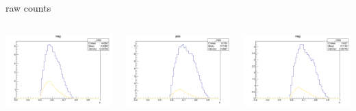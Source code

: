 \begin{frame}{raw counts}
\begin{columns}
\begin{column}[T]{0.25\textwidth}
\includegraphics[width = \textwidth]{results/yield/statistics/yield_x_Q2_z_0.50_5.000_0.60_neg.png}
\end{column}
\begin{column}[T]{0.25\textwidth}
\includegraphics[width = \textwidth]{results/yield/statistics/yield_x_Q2_z_0.50_5.000_0.70_pos.png}
\end{column}
\begin{column}[T]{0.25\textwidth}
\includegraphics[width = \textwidth]{results/yield/statistics/yield_x_Q2_z_0.50_5.000_0.70_neg.png}
\end{column}
\end{columns}
\end{frame}
